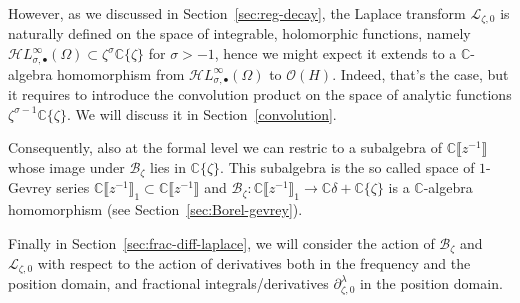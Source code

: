 \documentclass{article}
\newcommand{\singexp}[2]{\mathcal{H}L^\infty_{#1, #2}}
\newcommand{\singexpalg}[1]{\singexp{#1}{\bullet}}
\newcommand{\C}{\mathbb{C}}
\newcommand{\fracderiv}[3]{\partial^{#1}_{#2, #3}}
\newcommand{\laplace}{\mathcal{L}}
\newcommand{\borel}{\mathcal{B}}
\theoremstyle{definition}
\theoremstyle{plain}
\begin{document}
However, as we discussed in Section~\ref{sec:reg-decay}, the Laplace transform $\laplace_{\zeta,0}$ is naturally defined on the space of integrable, holomorphic functions, namely $\singexpalg{\sigma}(\Omega)\subset \zeta^{\sigma}\C\lbrace\zeta\rbrace$ for $\sigma>-1$, hence we might expect it extends to a $\C$-algebra homomorphism from $\singexpalg{\sigma}(\Omega)$ to $\mathcal{O}(H)$. Indeed, that's the case, but it requires to introduce the convolution product on the space of analytic functions $\zeta^{\sigma-1}\C\lbrace\zeta\rbrace$. We will discuss it in Section~\ref{convolution}. 

Consequently, also at the formal level we can restric to a subalgebra of $\C\llbracket z^{-1}\rrbracket$ whose image under $\borel_\zeta$ lies in $\C\lbrace\zeta\rbrace$. This subalgebra is the so called space of $1$-Gevrey series $\C\llbracket z^{-1}\rrbracket_1\subset\C\llbracket z^{-1}\rrbracket$ and $\borel_\zeta\colon \C\llbracket z^{-1}\rrbracket_1\to\C\delta+\C\lbrace\zeta\rbrace$ is a $\C$-algebra homomorphism (see Section~\ref{sec:Borel-gevrey}). 

Finally in Section~\ref{sec:frac-diff-laplace}, we will consider the action of $\borel_\zeta$ and $\laplace_{\zeta,0}$ with respect to the action of derivatives both in the frequency and the position domain, and fractional integrals/derivatives $\fracderiv{\lambda}{\zeta}{0}$ in the position domain. %
\end{document}
